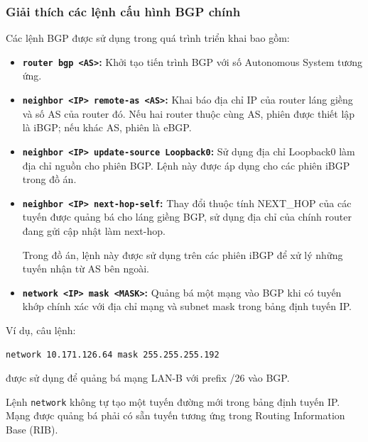 \subsubsection{Giải thích các lệnh cấu hình BGP chính}

Các lệnh BGP được sử dụng trong
quá trình triển khai bao gồm:

\begin{itemize}

    \item \textbf{\texttt{router bgp <AS>}:}
    Khởi tạo tiến trình BGP với
    số Autonomous System tương ứng.

    \item \textbf{\texttt{neighbor <IP> remote-as <AS>}:}
    Khai báo địa chỉ IP của router
    láng giềng và số AS của router đó.
    Nếu hai router thuộc cùng AS,
    phiên được thiết lập là iBGP;
    nếu khác AS, phiên là eBGP.

    \item \textbf{\texttt{neighbor <IP> update-source Loopback0}:}
    Sử dụng địa chỉ Loopback0
    làm địa chỉ nguồn cho phiên BGP.
    Lệnh này được áp dụng cho
    các phiên iBGP trong đồ án.

    \item \textbf{\texttt{neighbor <IP> next-hop-self}:}
    Thay đổi thuộc tính NEXT\_HOP
    của các tuyến được quảng bá
    cho láng giềng BGP, sử dụng
    địa chỉ của chính router
    đang gửi cập nhật làm next-hop.

    Trong đồ án, lệnh này được sử dụng
    trên các phiên iBGP để xử lý
    những tuyến nhận từ AS bên ngoài.

    \item \textbf{\texttt{network <IP> mask <MASK>}:}
    Quảng bá một mạng vào BGP
    khi có tuyến khớp chính xác
    với địa chỉ mạng và subnet mask
    trong bảng định tuyến IP.

\end{itemize}

Ví dụ, câu lệnh:

\begin{lstlisting}
network 10.171.126.64 mask 255.255.255.192
\end{lstlisting}

được sử dụng để quảng bá mạng LAN-B
với prefix /26 vào BGP.

Lệnh \texttt{network} không tự tạo
một tuyến đường mới trong bảng
định tuyến IP. Mạng được quảng bá
phải có sẵn tuyến tương ứng
trong Routing Information Base (RIB).


